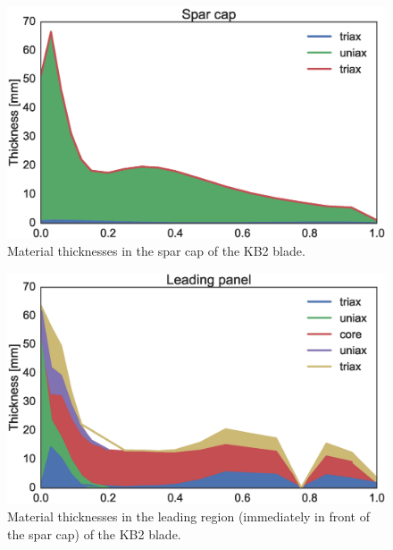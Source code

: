 \begin{figure}[!ht]
\begin{center}
	\includegraphics[width=.85\linewidth]{figures/KB2_region04.eps}
\end{center}
\caption{Material thicknesses in the spar cap of the KB2 blade.}
\label{fig:KB2matstackr04}
\end{figure}

\begin{figure}[!ht]
\begin{center}
	\includegraphics[width=.85\linewidth]{figures/KB2_region06.eps}
\end{center}
\caption{Material thicknesses in the leading region (immediately in front of the spar cap) of the KB2 blade.}
\label{fig:KB2matstackr06}
\end{figure}

